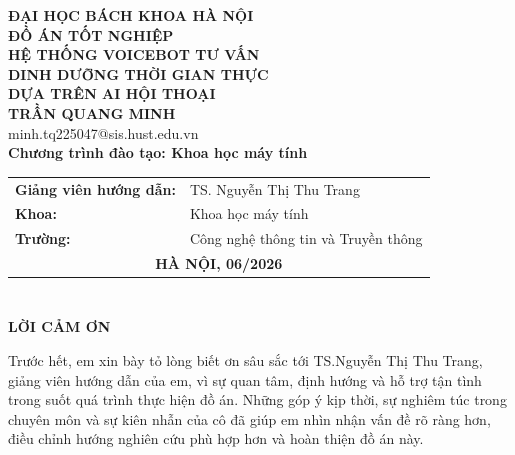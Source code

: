 \documentclass[a4paper,13pt,twoside]{report}
\makeatletter
\def\TITLELINEONE{HỆ THỐNG VOICEBOT TƯ VẤN}
\def\TITLELINETWO{DINH DƯỠNG THỜI GIAN THỰC}
\def\TITLELINETHREE{DỰA TRÊN AI HỘI THOẠI}
\def\AUTHOR{TRẦN QUANG MINH}
\def\STUDENTID{minh.tq225047@sis.hust.edu.vn}
\def\PROGRAM{Chương trình đào tạo: Khoa học máy tính}
\def\FACULTY{Khoa học máy tính}
\def\SCHOOL{Công nghệ thông tin và Truyền thông}
\def\UNIVERSITY{ĐẠI HỌC BÁCH KHOA HÀ NỘI}
\def\SUPERVISOR{TS. Nguyễn Thị Thu Trang}
\makeatother
\begin{document}
\begin{titlepage}
    \thispagestyle{empty}
    \begin{center}
        {\textbf{\large \UNIVERSITY}}\\[3.4cm]

        {\textbf{\huge ĐỒ ÁN TỐT NGHIỆP}}\\[0.9cm]
        {\textbf{\Large \TITLELINEONE}}\\[0.25cm]
        {\textbf{\Large \TITLELINETWO}}\\[0.25cm]
        {\textbf{\Large \TITLELINETHREE}}\\[0.9cm]

        {\textbf{\large \AUTHOR}}\\[-0.05cm]
        {\large \STUDENTID}\\[0.5cm]

        {\textbf{\large \PROGRAM}}

        \vspace{2.4cm}

        {\large
            \begin{tabular}{@{}ll@{}}
                \textbf{Giảng viên hướng dẫn:} & \SUPERVISOR \\[0.5cm]
                \textbf{Khoa:}                 & \FACULTY    \\[0.5cm]
                \textbf{Trường:}               & \SCHOOL     \\[3.5cm]
                \multicolumn{2}{c}{\textbf{HÀ NỘI, 06/2026}}
            \end{tabular}
        }
    \end{center}
\end{titlepage}

\justifying


\chapter*{}
\vspace*{-1.8cm}
\begin{center}
    {\textbf{\LARGE LỜI CẢM ƠN}}
\end{center}
\vspace{1.0cm}

Trước hết, em xin bày tỏ lòng biết ơn sâu sắc tới TS.Nguyễn Thị Thu Trang, giảng viên hướng dẫn của em, vì sự quan tâm, định hướng và hỗ trợ tận tình trong suốt quá trình thực hiện đồ án. Những góp ý kịp thời, sự nghiêm túc trong chuyên môn và sự kiên nhẫn của cô đã giúp em nhìn nhận vấn đề rõ ràng hơn, điều chỉnh hướng nghiên cứu phù hợp hơn và hoàn thiện đồ án này.
\end{document}
